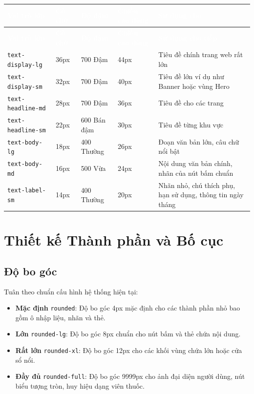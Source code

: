 \documentclass[12pt,a4paper]{article}
\newcommand{\code}[1]{\texttt{#1}}
\newcommand{\thead}[1]{\textbf{\textcolor{white}{#1}}}
\begin{document}
\begin{longtable}{|>{\raggedright\arraybackslash}p{3.5cm}|p{2cm}|p{2.5cm}|p{2cm}|>{\raggedright\arraybackslash}p{3cm}|}
\hline
\rowcolor{headerblue}
\thead{Vai trò lớp} & \thead{Cỡ chữ} & \thead{Độ đậm} & \thead{Chiều cao dòng} & \thead{Sử dụng cho} \\
\hline
\endfirsthead
\hline
\rowcolor{headerblue}
\thead{Vai trò lớp} & \thead{Cỡ chữ} & \thead{Độ đậm} & \thead{Chiều cao dòng} & \thead{Sử dụng cho tiếp} \\
\hline
\endhead
\code{text-display-lg} & 36px & 700 Đậm & 44px & Tiêu đề chính trang web rất lớn \\
\hline
\code{text-display-sm} & 32px & 700 Đậm & 40px & Tiêu đề lớn ví dụ như Banner hoặc vùng Hero \\
\hline
\code{text-headline-md} & 28px & 700 Đậm & 36px & Tiêu đề cho các trang \\
\hline
\code{text-headline-sm} & 22px & 600 Bán đậm & 30px & Tiêu đề từng khu vực \\
\hline
\code{text-body-lg} & 18px & 400 Thường & 26px & Đoạn văn bản lớn, câu chữ nổi bật \\
\hline
\code{text-body-md} & 16px & 500 Vừa & 24px & Nội dung văn bản chính, nhãn của nút bấm chuẩn \\
\hline
\code{text-label-sm} & 14px & 400 Thường & 20px & Nhãn nhỏ, chú thích phụ, hạn sử dụng, thông tin ngày tháng \\
\hline
\end{longtable}

\section{Thiết kế Thành phần và Bố cục}

\subsection{Độ bo góc}
Tuân theo chuẩn cấu hình hệ thống hiện tại:
\begin{itemize}[leftmargin=*]
  \item \textbf{Mặc định} \code{rounded}: Độ bo góc 4px mặc định cho các thành phần nhỏ bao gồm ô nhập liệu, nhãn và thẻ.
  \item \textbf{Lớn} \code{rounded-lg}: Độ bo góc 8px chuẩn cho nút bấm và thẻ chứa nội dung.
  \item \textbf{Rất lớn} \code{rounded-xl}: Độ bo góc 12px cho các khối vùng chứa lớn hoặc cửa sổ nổi.
  \item \textbf{Đầy đủ} \code{rounded-full}: Độ bo góc 9999px cho ảnh đại diện người dùng, nút biểu tượng tròn, huy hiệu dạng viên thuốc.
\end{itemize}
\end{document}
